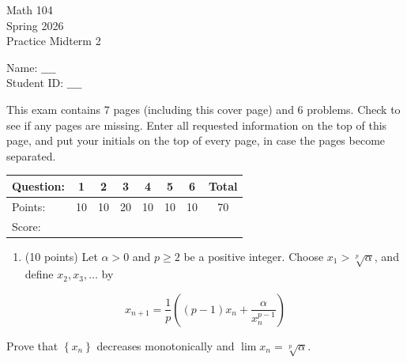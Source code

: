 \documentclass[10pt]{article}
\begin{document}
Math 104\\
Spring 2026\\
Practice Midterm 2

Name: $\_\_\_\_$\\
Student ID: $\_\_\_\_$

This exam contains 7 pages (including this cover page) and 6 problems. Check to see if any pages are missing. Enter all requested information on the top of this page, and put your initials on the top of every page, in case the pages become separated.

\begin{center}
\begin{tabular}{|l|c|c|c|c|c|c|c|}
\hline
Question: & 1 & 2 & 3 & 4 & 5 & 6 & Total \\
\hline
Points: & 10 & 10 & 20 & 10 & 10 & 10 & 70 \\
\hline
Score: &  &  &  &  &  &  &  \\
\hline
\end{tabular}
\end{center}

\clearpage
\begin{enumerate}
  \item (10 points) Let $\alpha>0$ and $p \geq 2$ be a positive integer. Choose $x_{1}>\sqrt[p]{\alpha}$, and define $x_{2}, x_{3}, \ldots$ by
\end{enumerate}

$$
x_{n+1}=\frac{1}{p}\left((p-1) x_{n}+\frac{\alpha}{x_{n}^{p-1}}\right)
$$

Prove that $\left\{x_{n}\right\}$ decreases monotonically and $\lim x_{n}=\sqrt[p]{\alpha}$.
\end{document}
